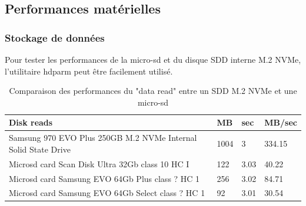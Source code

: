 ﻿\subsection{Performances matérielles}
\subsubsection{Stockage de données}
\par Pour tester les performances de la micro-sd et du disque SDD interne M.2 NVMe, l'utilitaire hdparm peut être facilement utilisé. 
{
   \vspace{0.3em} %
   \renewcommand*{\arraystretch}{1.4}
   \begin{longtable}[t]{@{}|p{25em}|p{2em}|p{2em}|p{3em}|@{}} 
      \caption{Comparaison des performances du "data read" entre un SDD M.2 NVMe et une micro-sd}\label{tab:Timing O_DIRECT disk reads}\\
      \hline
      \textbf{Disk reads} & \textbf{MB} & \textbf{sec} & \textbf{MB/sec}\\
      \hline
      Samsung 970 EVO Plus 250GB M.2 NVMe Internal Solid State Drive & 1004 & 3 & 334.15\\
      \hline
      Microsd card Scan Disk Ultra 32Gb class 10 HC I & 122 & 3.03 & 40.22\\
      \hline
      Microsd card Samsung EVO 64Gb Plus class ? HC 1 & 256 & 3.02 & 84.71\\
      \hline
      Microsd card Samsung EVO 64Gb Select class ? HC 1 & 92 & 3.01 & 30.54\\
      \hline
   \end{longtable}
}
